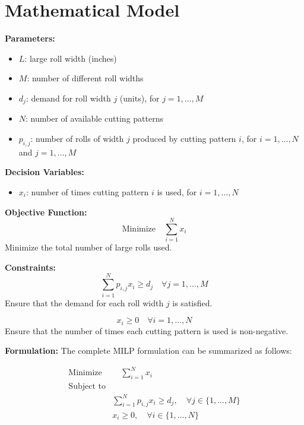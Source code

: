 \documentclass{article}
\begin{document}
\section*{Mathematical Model}

\textbf{Parameters:}
\begin{itemize}
    \item $L$: large roll width (inches)
    \item $M$: number of different roll widths
    \item $d_j$: demand for roll width $j$ (units), for $j = 1, \ldots, M$
    \item $N$: number of available cutting patterns
    \item $p_{i,j}$: number of rolls of width $j$ produced by cutting pattern $i$, for $i = 1, \ldots, N$ and $j = 1, \ldots, M$
\end{itemize}

\textbf{Decision Variables:}
\begin{itemize}
    \item $x_i$: number of times cutting pattern $i$ is used, for $i = 1, \ldots, N$
\end{itemize}

\textbf{Objective Function:}
\[
\text{Minimize} \quad \sum_{i=1}^{N} x_i
\]
Minimize the total number of large rolls used.

\textbf{Constraints:}
\[
\sum_{i=1}^{N} p_{i,j} x_i \geq d_j \quad \forall j = 1, \ldots, M
\]
Ensure that the demand for each roll width $j$ is satisfied.

\[
x_i \geq 0 \quad \forall i = 1, \ldots, N
\]
Ensure that the number of times each cutting pattern is used is non-negative.

\textbf{Formulation:}
The complete MILP formulation can be summarized as follows:

\[
\begin{align*}
\text{Minimize} & \quad \sum_{i=1}^{N} x_i \\
\text{Subject to} & \\
& \sum_{i=1}^{N} p_{i,j} x_i \geq d_j, \quad \forall j \in \{1, \ldots, M\} \\
& x_i \geq 0, \quad \forall i \in \{1, \ldots, N\}
\end{align*}
\]
\end{document}
